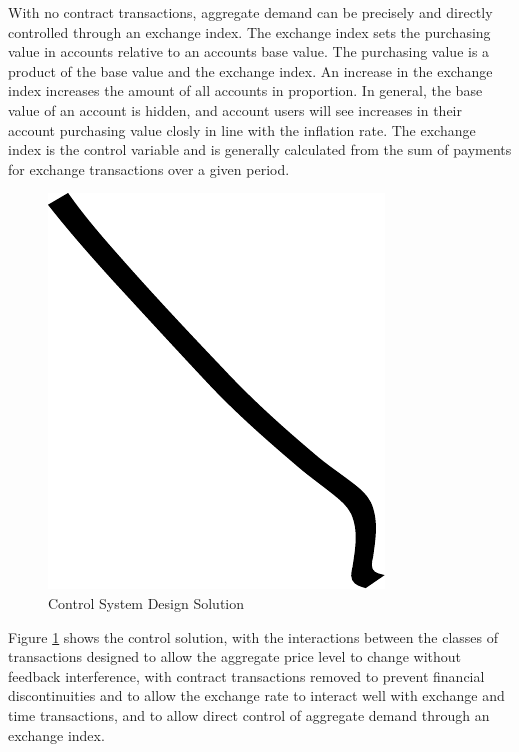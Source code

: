 With no contract transactions, aggregate demand can be precisely and directly controlled through an
exchange index.  The exchange index sets the purchasing value in accounts relative to an accounts
base value. The purchasing value is a product of the base value and the exchange index. An increase
in the exchange index increases the amount of all accounts in proportion. In general, the base value
of an account is hidden, and account users will see increases in their account purchasing value
closly in line with the inflation rate. The exchange index is the control variable and is generally
calculated from the sum of payments for exchange transactions over a given period.  

\begin{figure}
\centering
\includegraphics{img/example.pdf}
\caption{Control System Design Solution}
\label{fig:control_solution}
\end{figure}

Figure \ref{fig:control_solution} shows the control solution, with the interactions between the
classes of transactions designed to allow the aggregate price level to change without feedback
interference, with contract transactions removed to prevent financial discontinuities and to allow
the exchange rate to interact well with exchange and time transactions, and to allow direct control
of aggregate demand through an exchange index.



